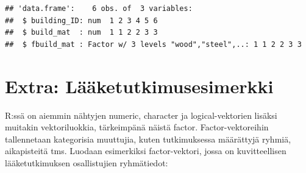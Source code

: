 \documentclass[
]{book}
\newenvironment{Shaded}{\begin{snugshade}}{\end{snugshade}}
\newcommand{\AttributeTok}[1]{\textcolor[rgb]{0.77,0.63,0.00}{#1}}
\newcommand{\CommentTok}[1]{\textcolor[rgb]{0.56,0.35,0.01}{\textit{#1}}}
\newcommand{\DecValTok}[1]{\textcolor[rgb]{0.00,0.00,0.81}{#1}}
\newcommand{\FunctionTok}[1]{\textcolor[rgb]{0.00,0.00,0.00}{#1}}
\newcommand{\NormalTok}[1]{#1}
\newcommand{\OtherTok}[1]{\textcolor[rgb]{0.56,0.35,0.01}{#1}}
\newcommand{\SpecialCharTok}[1]{\textcolor[rgb]{0.00,0.00,0.00}{#1}}
\newcommand{\StringTok}[1]{\textcolor[rgb]{0.31,0.60,0.02}{#1}}
\begin{document}
\begin{Shaded}
\end{Shaded}

\begin{verbatim}
## 'data.frame':    6 obs. of  3 variables:
##  $ building_ID: num  1 2 3 4 5 6
##  $ build_mat  : num  1 1 2 2 3 3
##  $ fbuild_mat : Factor w/ 3 levels "wood","steel",..: 1 1 2 2 3 3
\end{verbatim}

\hypertarget{factor-extra}{%
\section{Extra: Lääketutkimusesimerkki}\label{factor-extra}}

R:ssä on aiemmin nähtyjen numeric, character ja logical-vektorien lisäksi muitakin vektoriluokkia, tärkeimpänä näistä factor. Factor-vektoreihin tallennetaan kategorisia muuttujia, kuten tutkimuksessa määrättyjä ryhmiä, aikapisteitä tms. Luodaan esimerkiksi factor-vektori, jossa on kuvitteellisen lääketutkimuksen osallistujien ryhmätiedot:
\end{document}
